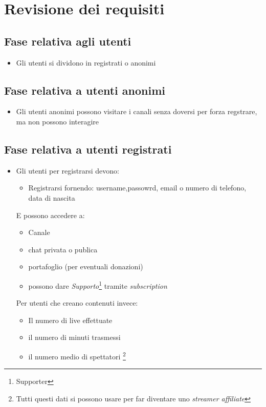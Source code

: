 \section{Revisione dei requisiti}

\subsection{Fase relativa agli utenti}
\begin{itemize}
  \item Gli utenti si dividono in registrati o anonimi
\end{itemize}
\subsection{Fase relativa a utenti anonimi}
\begin{itemize}
  \item Gli utenti anonimi possono visitare i canali senza doversi per 
  forza regstrare, ma non possono interagire 
\end{itemize}
\subsection{Fase relativa a utenti registrati}
\begin{itemize}
  \item Gli utenti per registrarsi devono:
  \begin{itemize}
    \item Registrarsi fornendo: username,passowrd, email o numero di telefono, data di nascita
  \end{itemize}
  E possono accedere a:
    \begin{itemize}
      \item Canale 
      \item chat privata o publica
      \item portafoglio (per eventuali donazioni)
      \item possono dare \textit{Supporto}\footnote{Supporter} tramite \textit{subscription}
    \end{itemize} 
  Per utenti che creano contenuti invece:
    \begin{itemize}
      \item Il numero di live effettuate 
      \item il numero di minuti trasmessi
      \item il numero medio di spettatori \footnote{Tutti questi dati si possono usare per far diventare uno \textit{streamer affiliate}} %
    \end{itemize}
\end{itemize}
